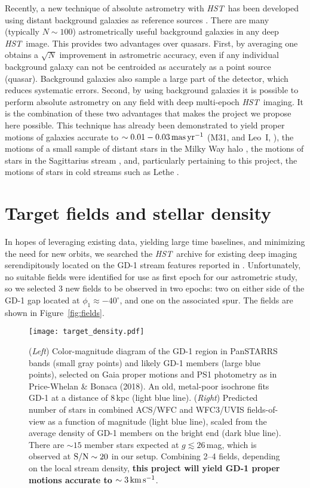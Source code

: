 \documentclass[12pt]{article}
\newcommand{\hst}{\textsl{HST}}
\begin{document}
Recently, a new technique of absolute astrometry with \hst\ has been developed using distant background galaxies as reference sources \parencite[e.g.,][]{mahmud2008, sohn2012,sohn2013}.
There are many (typically $N\sim100$) astrometrically useful background galaxies in any deep \hst\ image.
This provides two advantages over quasars.
First, by averaging one obtains a $\sqrt{N}$ improvement in astrometric accuracy, even if any individual background galaxy can not be centroided as accurately as a point source (quasar).
Background galaxies also sample a large part of the detector, which reduces systematic errors.
Second, by using background galaxies it is possible to perform absolute astrometry on any field with deep multi-epoch \hst\ imaging.
It is the combination of these two advantages that makes the project we propose here possible.
This technique has already been demonstrated to yield proper motions of galaxies accurate to $\sim0.01-0.03\,\rm mas\,yr^{-1}$ (M31, \cite{sohn2012,vdmarel2012a,vdmarel2012b} and Leo~I, \cite{sohn2013}), the motions of a small sample of distant stars in the Milky Way halo \parencite{deason2013}, the motions of stars in the Sagittarius stream \parencite{sohn2015}, and, particularly pertaining to this project, the motions of stars in cold streams such as Lethe \parencite[Figure~\ref{fig:lethe},][]{sohn2016}.


\section*{Target fields and stellar density}
In hopes of leveraging existing data, yielding large time baselines, and minimizing the need for new orbits, we searched the \hst\ archive for existing deep imaging serendipitously located on the GD-1 stream features reported in \textcite{pwb2018}.
Unfortunately, no suitable fields were identified for use as first epoch for our astrometric study, so we selected 3 new fields to be observed in two epochs: two on either side of the GD-1 gap located at $\phi_1\approx-40^\circ$, and one on the associated spur.
The fields are shown in Figure~\ref{fig:fields}.

\begin{figure}
\begin{center}
\texttt{[image: target\_density.pdf]}
\end{center}
\caption{
(\emph{Left}) Color-magnitude diagram of the GD-1 region in PanSTARRS bands (small gray points) and likely GD-1 members (large blue points), selected on Gaia proper motions and PS1 photometry as in Price-Whelan \& Bonaca (2018).
An old, metal-poor isochrone fits GD-1 at a distance of 8\,kpc (light blue line).
(\emph{Right}) Predicted number of stars in combined ACS/WFC and WFC3/UVIS fields-of-view as a function of magnitude (light blue line), scaled from the average density of GD-1 members on the bright end (dark blue line).
There are $\sim15$ member stars expected at $g\lesssim26$\,mag, which is observed at $\rm S/N\sim20$ in our setup.
Combining 2--4 fields, depending on the local stream density, \textbf{this project will yield GD-1 proper motions accurate to $\sim3\,\rm km\,s^{-1}$}.
}
\label{fig:density}
\end{figure}
\end{document}
